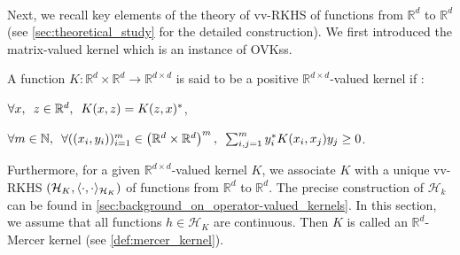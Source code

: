 \paragraph{}
Next, we recall key elements of the theory of \ac{vv-RKHS} of functions from
$\mathbb{R}^d$ to $\mathbb{R}^d$ (see \cref{sec:theoretical_study} for the
detailed construction). We first introduced the matrix-valued kernel which
is an instance of \acsp{OVK}s.
\begin{definition}  A function
    $K:\mathbb{R}^d\times\mathbb{R}^d\to\mathbb{R}^{d\times d}$ is said to be a
    positive $\mathbb{R}^{d\times d}$-valued kernel  if :
    \begin{propenum}
        \item $\forall x,\enskip z \in\mathbb{R}^d,\enskip K(x, z)= K(z,
        x)^*$, \item $\forall m \in \mathbb{N},\enskip \forall ((x_i,
        y_i))_{i=1}^m\in\left(\mathbb{R}^d\times\mathbb{R}^d\right)^m,\enskip
        \sum_{i,j=1}^m y_i^* K(x_i, x_j)y_j \geq  0$.
    \end{propenum}
\end{definition}
Furthermore, for a given $\mathbb{R}^{d\times d}$-valued kernel $K$, we
associate $K$ with a unique \acs{vv-RKHS}
$(\mathcal{H}_K,\langle\cdot,\cdot\rangle_{\mathcal{H}_K})$ of functions from
$\mathbb{R}^d$ to $\mathbb{R}^d$. The precise construction of $\mathcal{H}_k$
can be found in \cref{sec:background_on_operator-valued_kernels}. In this
section, we assume that all functions $h\in\mathcal{H}_K$ are continuous. Then
$K$ is called an $\mathbb{R}^d$-Mercer kernel (see \cref{def:mercer_kernel}).
